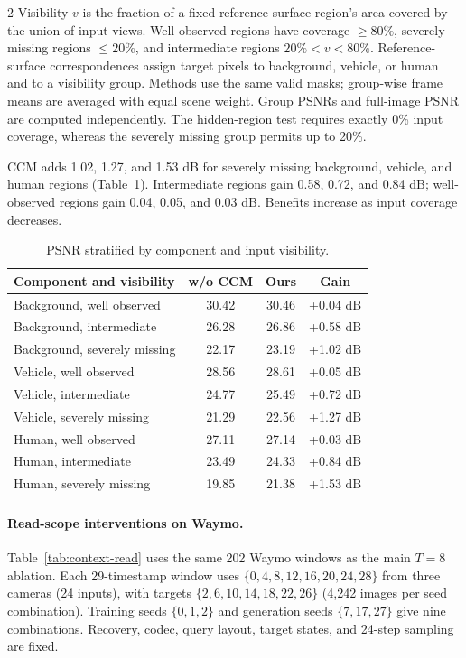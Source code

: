 \begin{multicols}{2}
Visibility $v$ is the fraction of a fixed reference surface region's area covered by the union of input views. Well-observed regions have coverage $\geq80\%$, severely missing regions $\leq20\%$, and intermediate regions $20\%<v<80\%$. Reference-surface correspondences assign target pixels to background, vehicle, or human and to a visibility group. Methods use the same valid masks; group-wise frame means are averaged with equal scene weight. Group PSNRs and full-image PSNR are computed independently. The hidden-region test requires exactly 0\% input coverage, whereas the severely missing group permits up to 20\%.

CCM adds 1.02, 1.27, and 1.53 dB for severely missing background, vehicle, and human regions (Table~\ref{tab:visibility}). Intermediate regions gain 0.58, 0.72, and 0.84 dB; well-observed regions gain 0.04, 0.05, and 0.03 dB. Benefits increase as input coverage decreases.

\begin{table}[H]
\centering\small
\setlength{\tabcolsep}{4pt}
\caption{PSNR stratified by component and input visibility.}
\label{tab:visibility}
\begin{tabular}{@{}lccc@{}}
\toprule
Component and visibility & w/o CCM & Ours & Gain \\
\midrule
Background, well observed & 30.42 & 30.46 & +0.04 dB \\
Background, intermediate & 26.28 & 26.86 & +0.58 dB \\
Background, severely missing & 22.17 & 23.19 & +1.02 dB \\
Vehicle, well observed & 28.56 & 28.61 & +0.05 dB \\
Vehicle, intermediate & 24.77 & 25.49 & +0.72 dB \\
Vehicle, severely missing & 21.29 & 22.56 & +1.27 dB \\
Human, well observed & 27.11 & 27.14 & +0.03 dB \\
Human, intermediate & 23.49 & 24.33 & +0.84 dB \\
Human, severely missing & 19.85 & 21.38 & +1.53 dB \\
\bottomrule
\end{tabular}
\end{table}

\paragraph{Read-scope interventions on Waymo.}
Table~\ref{tab:context-read} uses the same 202 Waymo windows as the main $T=8$ ablation. Each 29-timestamp window uses $\{0,4,8,12,16,20,24,28\}$ from three cameras (24 inputs), with targets $\{2,6,10,14,18,22,26\}$ (4,242 images per seed combination). Training seeds $\{0,1,2\}$ and generation seeds $\{7,17,27\}$ give nine combinations. Recovery, codec, query layout, target states, and 24-step sampling are fixed.


\end{multicols}
